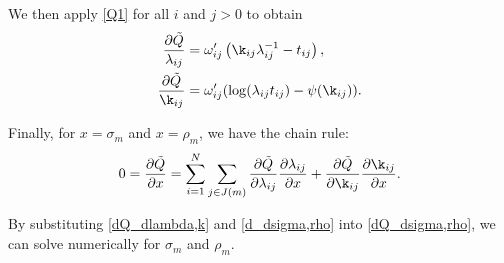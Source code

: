 \documentclass[12pt,leqno]{article}
\begin{document}
We then apply \eqref{Q1} for all $i$ and $j>0$ to obtain 
\begin{equation}\label{dQ_dlambda,k}
   \begin{split}
     \frac{\partial\tilde{Q}}{\lambda_{ij}} &= \omega'_{ij}\left(\k_{ij}\lambda_{ij}^{-1}-t_{ij}\right), \\
    \frac{\partial\tilde{Q}}{\k_{ij}} &= \omega'_{ij}(\log(\lambda_{ij}t_{ij})-\psi(\k_{ij})).
   \end{split}
\end{equation}

Finally, for $x = \sigma_m$ and $x = \rho_m$, we have the chain rule:
\begin{equation}\label{dQ_dsigma,rho}
  0 = \frac{\partial\tilde{Q}}{\partial{x}} = \sum_{i=1}^N\sum_{j\in J(m)}\frac{\partial\tilde{Q}}{\partial\lambda_{ij}}\frac{\partial\lambda_{ij}}{\partial{x}} +
    \frac{\partial\tilde{Q}}{\partial\k_{ij}}\frac{\partial\k_{ij}}{\partial{x}}.
\end{equation}

By substituting \eqref{dQ_dlambda,k} and \eqref{d_dsigma,rho} into \eqref{dQ_dsigma,rho},
we can solve numerically for $\sigma_m$ and $\rho_m$.



 
\end{document}
